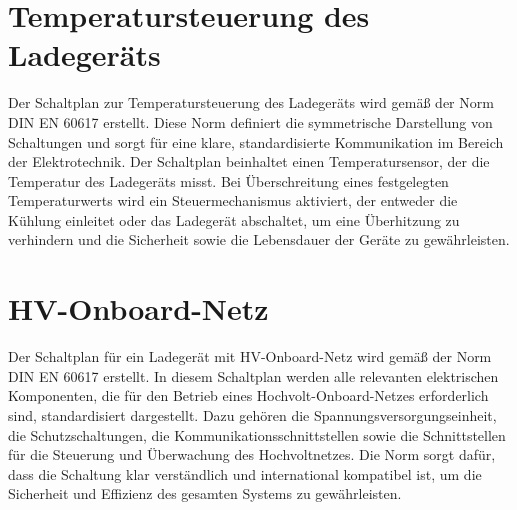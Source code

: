 \section*{Temperatursteuerung des Ladegeräts}
Der Schaltplan zur Temperatursteuerung des Ladegeräts wird gemäß der Norm DIN EN 60617 erstellt. Diese Norm definiert die symmetrische Darstellung von Schaltungen und sorgt für eine klare, standardisierte Kommunikation im Bereich der Elektrotechnik. Der Schaltplan beinhaltet einen Temperatursensor, der die Temperatur des Ladegeräts misst. Bei Überschreitung eines festgelegten Temperaturwerts wird ein Steuermechanismus aktiviert, der entweder die Kühlung einleitet oder das Ladegerät abschaltet, um eine Überhitzung zu verhindern und die Sicherheit sowie die Lebensdauer der Geräte zu gewährleisten.
% 
\addtocounter{page}{1} 
\section*{HV-Onboard-Netz}

Der Schaltplan für ein Ladegerät mit HV-Onboard-Netz wird gemäß der Norm DIN EN 60617 erstellt. In diesem Schaltplan werden alle relevanten elektrischen Komponenten, die für den Betrieb eines Hochvolt-Onboard-Netzes erforderlich sind, standardisiert dargestellt. Dazu gehören die Spannungsversorgungseinheit, die Schutzschaltungen, die Kommunikationsschnittstellen sowie die Schnittstellen für die Steuerung und Überwachung des Hochvoltnetzes. Die Norm sorgt dafür, dass die Schaltung klar verständlich und international kompatibel ist, um die Sicherheit und Effizienz des gesamten Systems zu gewährleisten.
 
\addtocounter{page}{1} 
